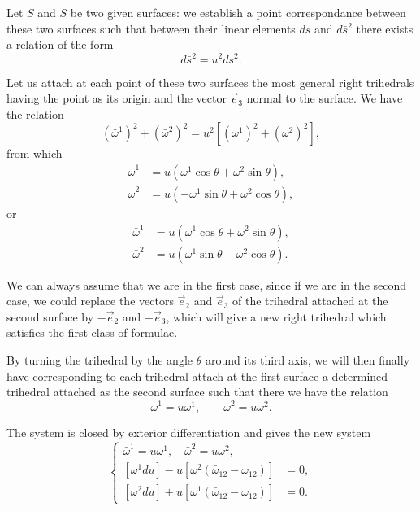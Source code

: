 \documentclass[leqno,11pt]{book}
\numberwithin{equation}{chapter}
\theoremstyle{shape1}
\theoremstyle{shape0}
\theoremstyle{shape2}
\theoremstyle{definition}
\begin{document}
\fsec Let $S$ and $\bar S$ be two given surfaces: we establish a point correspondance between these two surfaces such that between their linear elements $ds$ and $d\bar s^{2}$ there exists a relation of the form
\[
d\bar s^{2}=u^{2}ds^{2}.
\]

Let us attach at each point of these two surfaces the most general right trihedrals having the point as its origin and the vector $\vec e_{3}$ normal to the surface. We have the relation
\[
(\bar \omega^{1})^{2}+(\bar \omega^{2})^{2}=u^{2}[(\omega^{1})^{2}+(\omega^{2})^{2}],
\]
from which
\begin{align*}
  \bar\omega^{1}&=u(\omega^{1}\cos\theta+\omega^{2}\sin\theta),\\
  \bar\omega^{2}&=u(-\omega^{1}\sin\theta+\omega^{2}\cos\theta),
\end{align*}
or
\begin{align*}
  \bar\omega^{1}&=u(\omega^{1}\cos\theta+\omega^{2}\sin\theta),\\
  \bar\omega^{2}&=u(\omega^{1}\sin\theta-\omega^{2}\cos\theta).
\end{align*}

We can always assume that we are in the first case, since if we are in the second case, we could replace the vectors $\vec e_{2}$ and $\vec e_{3}$ of the trihedral attached at the second surface by $-\vec e_{2}$ and $-\vec e_{3}$, which will give a new right trihedral which satisfies the first class of formulae.

By turning the trihedral by the angle $\theta$ around its third axis, we will then finally have corresponding to each trihedral attach at the first surface a determined trihedral attached as the second surface such that there we have the relation
\begin{equation}
  \label{eq:7.II.1}
  \tag{II, 1}
  \bar\omega^{1}=u\omega^{1},\qquad\bar\omega^{2}=u\omega^{2}.
\end{equation}

The system is closed by exterior differentiation and gives the new system
\begin{equation}
  \label{eq:7.II.2}
  \tag{II, 2}
  \left\{
    \begin{aligned}
      \bar\omega^{1}=u\omega^{1},\quad\bar\omega^{2}=u\omega^{2},\\
      [\omega^{1}du]-u[\omega^{2}(\bar\omega_{12}-\omega_{12})]&=0,\\
      [\omega^{2}du]+u[\omega^{1}(\bar\omega_{12}-\omega_{12})]&=0.
    \end{aligned}
  \right.
\end{equation}
\end{document}
